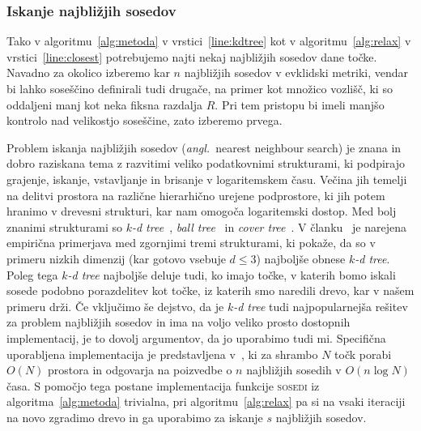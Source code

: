 \documentclass[12pt,a4paper]{article}
\theoremstyle{definition} %
\theoremstyle{plain} %
\numberwithin{equation}{section}
\newcommand{\ang}[1]{(\textit{angl.}\ #1)}
\begin{document}
\subsubsection{Iskanje najbližjih sosedov}

Tako v algoritmu~\ref{alg:metoda} v vrstici~\ref{line:kdtree} kot v
algoritmu~\ref{alg:relax} v vrstici~\ref{line:closest} potrebujemo
najti nekaj najbližjih sosedov dane točke. Navadno za okolico izberemo kar
$n$ najbližjih sosedov v evklidski metriki, vendar bi lahko soseščino definirali
tudi drugače, na primer kot množico vozlišč, ki so oddaljeni manj kot neka
fiksna razdalja $R$.  Pri tem pristopu bi imeli manjšo kontrolo nad velikostjo
soseščine, zato izberemo prvega.

Problem iskanja najbližjih sosedov \ang{nearest neighbour search} je znana in
dobro raziskana tema z razvitimi veliko podatkovnimi strukturami, ki podpirajo
grajenje, iskanje, vstavljanje in brisanje v logaritemskem času. Večina jih
temelji na delitvi prostora na različne hierarhično urejene podprostore, ki jih
potem hranimo v drevesni strukturi, kar nam omogoča logaritemski dostop. Med
bolj znanimi strukturami so \emph{$k$-d tree}~\cite{moore1991intoductory},
\emph{ball tree}~\cite{omohundro1989five} in \emph{cover
tree}~\cite{beygelzimer2006cover}. V članku~\cite{kibriya2007empirical} je
narejena empirična primerjava med zgornjimi tremi strukturami, ki pokaže, da
so v primeru nizkih dimenzij (kar gotovo vsebuje $d \leq 3$) najboljše obnese
\emph{$k$-d tree}. Poleg tega \emph{$k$-d tree} najboljše deluje tudi, ko imajo
točke, v katerih bomo iskali sosede podobno porazdelitev kot točke, iz katerih
smo naredili drevo, kar v našem primeru drži. Če vključimo še dejstvo, da je
\emph{$k$-d tree} tudi najpopularnejša rešitev za problem najbližjih sosedov
in ima na voljo veliko prosto dostopnih implementacij, je to dovolj argumentov,
da jo uporabimo tudi mi. Specifična uporabljena implementacija je predstavljena
v~\cite{mount1998ann}, ki za shrambo $N$ točk porabi $O(N)$ prostora in
odgovarja na poizvedbe o $n$ najbližjih sosedih v $O(n\log N)$ časa.
S pomočjo tega postane implementacija funkcije \textsc{sosedi} iz
algoritma~\ref{alg:metoda} trivialna, pri algoritmu~\ref{alg:relax} pa si na
vsaki iteraciji na novo zgradimo drevo in ga uporabimo za iskanje $s$ najbližjih
sosedov.
\end{document}
